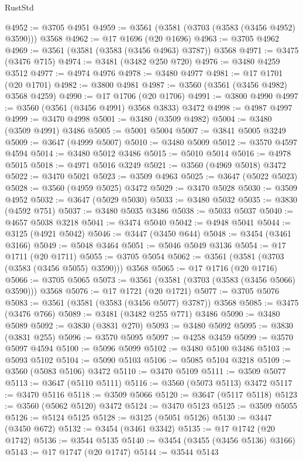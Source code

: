 \begin{lexlean}{RustStd}
\begin{coremodule}
@4952 := @3705 @4951
@4959 := @3561 (@3581 (@3703 (@3583 (@3456 @4952) @3590))) @3568
@4962 := @17 @1696 (@20 @1696)
@4963 := @3705 @4962
@4969 := @3561 (@3581 (@3583 (@3456 @4963) @3787)) @3568
@4971 := @3475 (@3476 @715)
@4974 := @3481 (@3482 @250 @720)
@4976 := @3480 @4259 @3512
@4977 := @4974 @4976
@4978 := @3480 @4977
@4981 := @17 @1701 (@20 @1701)
@4982 := @3800 @4981
@4987 := @3560 (@3561 (@3456 @4982) @3568 @4259)
@4990 := @17 @1706 (@20 @1706)
@4991 := @3800 @4990
@4997 := @3560 (@3561 (@3456 @4991) @3568 @3833) @3472
@4998 := @4987 @4997
@4999 := @3470 @4998
@5001 := @3480 (@3509 @4982)
@5004 := @3480 (@3509 @4991) @3486
@5005 := @5001 @5004
@5007 := @3841 @5005 @3249
@5009 := @3647 (@4999 @5007)
@5010 := @3480 @5009
@5012 := @3570 @4597 @4594
@5014 := @3480 @5012 @3486
@5015 := @5010 @5014
@5016 := @4978 @5015
@5018 := @4971 @5016 @3249
@5021 := @3560 (@4969 @5018) @3472
@5022 := @3470 @5021
@5023 := @3509 @4963
@5025 := @3647 (@5022 @5023)
@5028 := @3560 (@4959 @5025) @3472
@5029 := @3470 @5028
@5030 := @3509 @4952
@5032 := @3647 (@5029 @5030)
@5033 := @3480 @5032
@5035 := @3830 (@4592 @751)
@5037 := @3480 @5035 @3486
@5038 := @5033 @5037
@5040 := @4657 @5038 @3218
@5041 := @3474 @5040
@5042 := @4948 @5041
@5044 := @3125 (@4921 @5042)
@5046 := @3447 (@3450 @644)
@5048 := @3454 (@3461 @3166)
@5049 := @5048 @3464
@5051 := @5046 @5049 @3136
@5054 := @17 @1711 (@20 @1711)
@5055 := @3705 @5054
@5062 := @3561 (@3581 (@3703 (@3583 (@3456 @5055) @3590))) @3568
@5065 := @17 @1716 (@20 @1716)
@5066 := @3705 @5065
@5073 := @3561 (@3581 (@3703 (@3583 (@3456 @5066) @3590))) @3568
@5076 := @17 @1721 (@20 @1721)
@5077 := @3705 @5076
@5083 := @3561 (@3581 (@3583 (@3456 @5077) @3787)) @3568
@5085 := @3475 (@3476 @766)
@5089 := @3481 (@3482 @255 @771) @3486
@5090 := @3480 @5089
@5092 := @3830 (@3831 @270)
@5093 := @3480 @5092
@5095 := @3830 (@3831 @255)
@5096 := @3570 @5095
@5097 := @4258 @3459
@5099 := @3570 @5097 @4594
@5100 := @5096 @5099
@5102 := @3480 @5100 @3486
@5103 := @5093 @5102
@5104 := @5090 @5103
@5106 := @5085 @5104 @3218
@5109 := @3560 (@5083 @5106) @3472
@5110 := @3470 @5109
@5111 := @3509 @5077
@5113 := @3647 (@5110 @5111)
@5116 := @3560 (@5073 @5113) @3472
@5117 := @3470 @5116
@5118 := @3509 @5066
@5120 := @3647 (@5117 @5118)
@5123 := @3560 (@5062 @5120) @3472
@5124 := @3470 @5123
@5125 := @3509 @5055
@5126 := @5124 @5125
@5128 := @3125 (@5051 @5126)
@5130 := @3447 (@3450 @672)
@5132 := @3454 (@3461 @3342)
@5135 := @17 @1742 (@20 @1742)
@5136 := @3544 @5135
@5140 := @3454 (@3455 (@3456 @5136) @3166)
@5143 := @17 @1747 (@20 @1747)
@5144 := @3544 @5143

\end{coremodule}
\end{lexlean}
